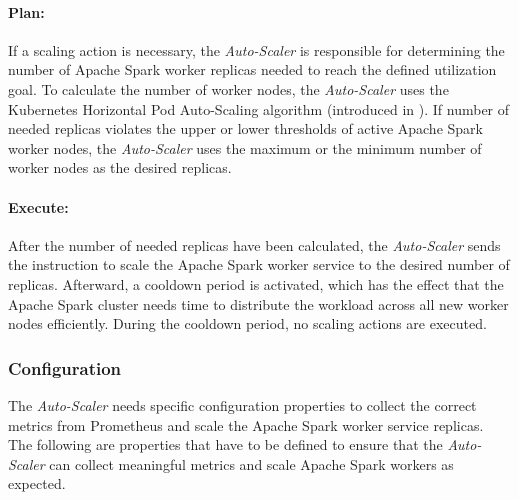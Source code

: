 \paragraph{Plan:}
If a scaling action is necessary, the \textit{Auto-Scaler} is responsible for determining the number of Apache Spark worker replicas needed to reach the defined utilization goal.
To calculate the number of worker nodes, the \textit{Auto-Scaler} uses the Kubernetes Horizontal Pod Auto-Scaling algorithm (introduced in ).
If number of needed replicas violates the upper or lower thresholds of active Apache Spark worker nodes, the \textit{Auto-Scaler} uses the maximum or the minimum number of worker nodes as the desired replicas.

\paragraph{Execute:}
After the number of needed replicas have been calculated, the \textit{Auto-Scaler} sends the instruction to scale the Apache Spark worker service to the desired number of replicas.
Afterward, a cooldown period is activated, which has the effect that the Apache Spark cluster needs time to distribute the workload across all new worker nodes efficiently. During the cooldown period, no scaling actions are executed.


\subsubsection{Configuration}
\label{subsubsec:05_am_auto-scaler_config}
The \textit{Auto-Scaler} needs specific configuration properties to collect the correct metrics from Prometheus and scale the Apache Spark worker service replicas. The following are properties that have to be defined to ensure that the \textit{Auto-Scaler} can collect meaningful metrics and scale Apache Spark workers as expected.

